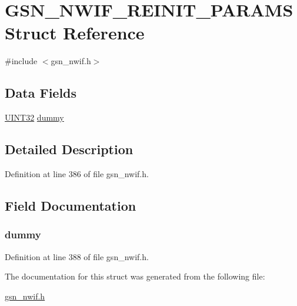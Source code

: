 \hypertarget{a00175}{
\section{GSN\_\-NWIF\_\-REINIT\_\-PARAMS Struct Reference}
\label{a00175}
}


{\ttfamily \#include $<$gsn\_\-nwif.h$>$}

\subsection*{Data Fields}
\begin{DoxyCompactItemize}
\item 
\hyperlink{a00660_gae1e6edbbc26d6fbc71a90190d0266018}{UINT32} \hyperlink{a00175_a60eb8a6fd120dd10ad8f59f6f3b74b39}{dummy}
\end{DoxyCompactItemize}


\subsection{Detailed Description}


Definition at line 386 of file gsn\_\-nwif.h.



\subsection{Field Documentation}
\hypertarget{a00175_a60eb8a6fd120dd10ad8f59f6f3b74b39}{
\subsubsection[{dummy}]{ {\bf dummy}}}
\label{a00175_a60eb8a6fd120dd10ad8f59f6f3b74b39}


Definition at line 388 of file gsn\_\-nwif.h.



The documentation for this struct was generated from the following file:\begin{DoxyCompactItemize}
\item 
\hyperlink{a00534}{gsn\_\-nwif.h}\end{DoxyCompactItemize}
